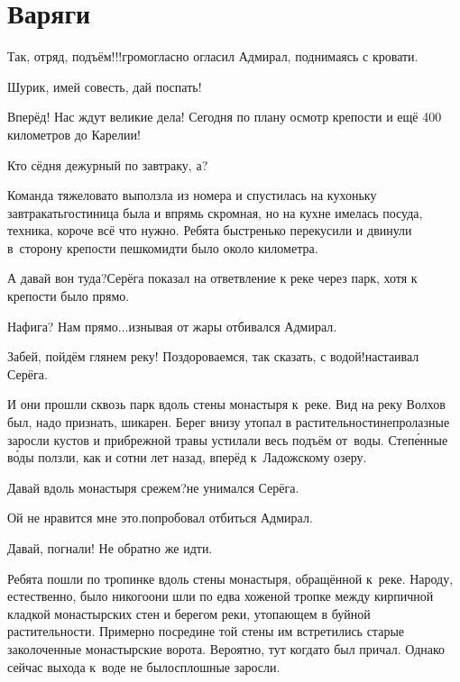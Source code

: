 \chapter{Варяги}
\vepsianrose
\fancyhead[LE]{\fancyplain{}{\bfseries \parttitle}}
\fancyhead[RO]{\fancyplain{}{\bfseries \rightmark}}

\diagdash Так, отряд, подъём!!!\mdash громогласно огласил Адмирал, поднимаясь с кровати.

\diagdash Шурик, имей совесть, дай поспать!

\diagdash Вперёд! Нас ждут великие дела! Сегодня по плану осмотр крепости и ещё 400 километров до Карелии!

\diagdash Кто сёдня дежурный по завтраку, а?

Команда тяжеловато выползла из номера и спустилась на кухоньку завтракать\mdash гостиница была и впрямь скромная, но на кухне имелась посуда, техника, короче всё что нужно. Ребята быстренько перекусили и двинули в~сторону крепости пешком\mdash идти было около километра.

\diagdash А давай вон туда?\mdash Серёга показал на ответвление к реке через парк, хотя к крепости было прямо.

\diagdash Нафига? Нам прямо$\ldots$\mdash изнывая от жары отбивался Адмирал.

\diagdash Забей, пойдём глянем реку! Поздороваемся, так сказать, с водой!\mdash настаивал Серёга.

И они прошли сквозь парк вдоль стены монастыря к~реке. Вид на реку Волхов был, надо признать, шикарен. Берег внизу утопал в растительности\mdash непролазные заросли кустов и прибрежной травы устилали весь подъём от~воды. Степ\'{е}нные в\'{о}ды ползли, как и сотни лет назад, вперёд к~Ладожскому озеру.

\diagdash Давай вдоль монастыря срежем?\mdash не унимался Серёга.

\diagdash Ой не нравится мне это.\mdash попробовал отбиться Адмирал.

\diagdash Давай, погнали! Не обратно же идти.

Ребята пошли по тропинке вдоль стены монастыря, обращённой к~реке. Народу, естественно, было никого\mdash они шли по едва хоженой тропке между кирпичной кладкой монастырских стен и берегом реки, утопающем в буйной растительности. Примерно посредине той стены им встретились старые заколоченные монастырские ворота. Вероятно, тут когда\sdash то был причал. Однако сейчас выхода к~воде не было\mdash сплошные заросли. 

